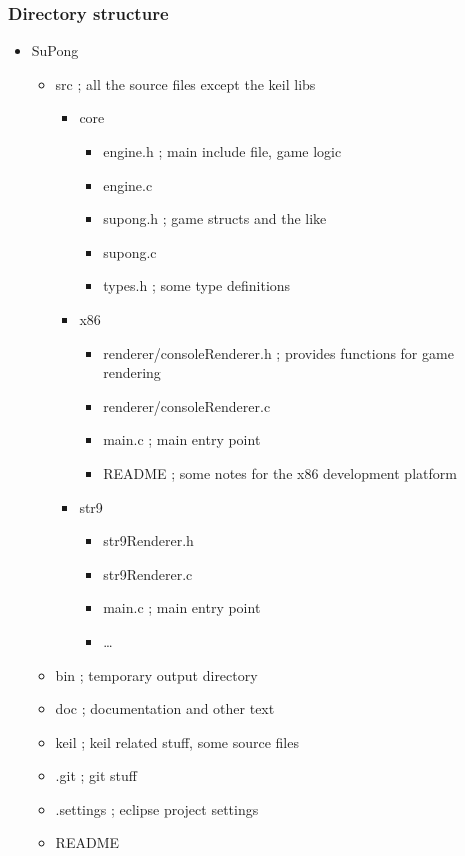 \subsubsection{Directory structure}
\begin{itemize}
  \item SuPong
  \begin{itemize}
	  
	  \item src  ; all the source files except the keil libs
	  \begin{itemize}
	  	\item core
		  \begin{itemize}
		  	\item engine.h   ; main include file, game logic
		  	\item engine.c	 
		  	\item supong.h   ; game structs and the like
		  	\item supong.c
		  	\item types.h    ; some type definitions
		  \end{itemize}
      
      \item x86
	      \begin{itemize}
	        \item renderer/consoleRenderer.h  ; provides functions for game
	        rendering
	        \item renderer/consoleRenderer.c
            \item main.c  ; main entry point
            \item README  ; some notes for the x86 development platform
          \end{itemize}
      
      \item str9
	      \begin{itemize}
	        \item str9Renderer.h
	        \item str9Renderer.c
            \item main.c  ; main entry point
	        \item \ldots
          \end{itemize}
      \end{itemize}
	  
	  \item bin  ; temporary output directory
	  \item doc  ; documentation and other text
	  \item keil ; keil related stuff, some source files
	  \item .git ; git stuff
	  \item .settings  ; eclipse project settings
	  \item README
	\end{itemize}
\end{itemize}

